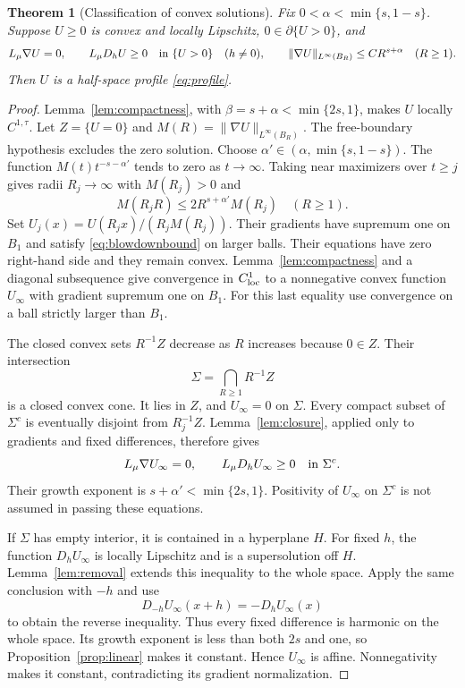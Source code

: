 \documentclass[11pt]{article}
\numberwithin{equation}{section}
\newtheorem{theorem}{Theorem}[section]
\theoremstyle{remark}
\newcommand{\norm}[1]{\lVert #1\rVert}
\begin{document}
\begin{theorem}[Classification of convex solutions]\label{thm:classification}
Fix $0<\alpha<\min\{s,1-s\}$. Suppose $U\ge0$ is convex and locally Lipschitz, $0\in\partial\{U>0\}$, and
\begin{equation}\label{eq:classhyp}
 L_\mu\nabla U=0,\qquad L_\mu D_hU\ge0
 \quad\hbox{in }\{U>0\}\quad(h\ne0),\qquad
 \norm{\nabla U}_{L^\infty(B_R)}\le CR^{s+\alpha}\quad(R\ge1).
\end{equation}
Then $U$ is a half-space profile \eqref{eq:profile}.
\end{theorem}
\begin{proof}
Lemma~\ref{lem:compactness}, with $\beta=s+\alpha<\min\{2s,1\}$, makes $U$ locally $C^{1,\tau}$. Let $Z=\{U=0\}$ and $M(R)=\norm{\nabla U}_{L^\infty(B_R)}$. The free-boundary hypothesis excludes the zero solution. Choose
$\alpha'\in(\alpha,\min\{s,1-s\})$. The function $M(t)t^{-s-\alpha'}$ tends to zero as $t\to\infty$. Taking near maximizers over $t\ge j$ gives radii $R_j\to\infty$ with $M(R_j)>0$ and
\begin{equation}\label{eq:blowdownbound}
 M(R_jR)\le2R^{s+\alpha'}M(R_j)\quad(R\ge1).
\end{equation}
Set $U_j(x)=U(R_jx)/(R_jM(R_j))$. Their gradients have supremum one on $B_1$ and satisfy \eqref{eq:blowdownbound} on larger balls. Their equations have zero right-hand side and they remain convex. Lemma~\ref{lem:compactness} and a diagonal subsequence give convergence in $C^1_{\rm loc}$ to a nonnegative convex function $U_\infty$ with gradient supremum one on $B_1$. For this last equality use convergence on a ball strictly larger than $B_1$.

The closed convex sets $R^{-1}Z$ decrease as $R$ increases because $0\in Z$. Their intersection
\[
 \Sigma=\bigcap_{R\ge1}R^{-1}Z
\]
is a closed convex cone. It lies in $Z$, and $U_\infty=0$ on $\Sigma$. Every compact subset of $\Sigma^c$ is eventually disjoint from $R_j^{-1}Z$. Lemma~\ref{lem:closure}, applied only to gradients and fixed differences, therefore gives
\begin{equation}\label{eq:limitcone}
 L_\mu\nabla U_\infty=0,\qquad L_\mu D_hU_\infty\ge0
 \quad\hbox{in }\Sigma^c.
\end{equation}
Their growth exponent is $s+\alpha'<\min\{2s,1\}$. Positivity of $U_\infty$ on $\Sigma^c$ is not assumed in passing these equations.

If $\Sigma$ has empty interior, it is contained in a hyperplane $H$. For fixed $h$, the function $D_hU_\infty$ is locally Lipschitz and is a supersolution off $H$. Lemma~\ref{lem:removal} extends this inequality to the whole space. Apply the same conclusion with $-h$ and use
\[
 D_{-h}U_\infty(x+h)=-D_hU_\infty(x)
\]
to obtain the reverse inequality. Thus every fixed difference is harmonic on the whole space. Its growth exponent is less than both $2s$ and one, so Proposition~\ref{prop:linear} makes it constant. Hence $U_\infty$ is affine. Nonnegativity makes it constant, contradicting its gradient normalization.


\end{proof}
\end{document}
